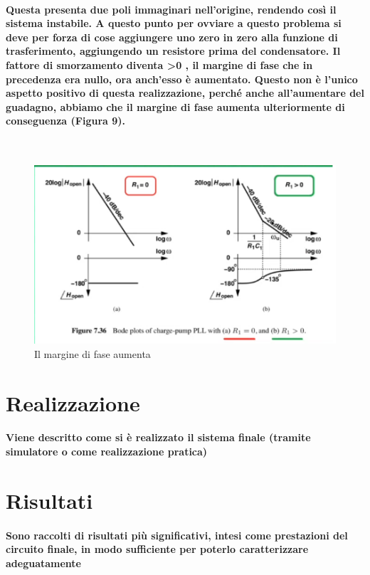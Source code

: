 \documentclass{article}
\begin{document}
\paragraph{Questa presenta due poli immaginari nell'origine, rendendo così il sistema instabile. A questo punto per ovviare a questo problema si deve per forza di cose aggiungere uno zero in zero alla funzione di trasferimento, aggiungendo un resistore prima del condensatore.
Il fattore di smorzamento diventa >0 , il margine di fase che in precedenza era nullo, ora anch'esso è aumentato.  
Questo non è l'unico aspetto positivo di questa realizzazione, perché anche all'aumentare del guadagno, abbiamo che il margine di fase aumenta ulteriormente di conseguenza (Figura 9).}
~\begin{figure}[!h]%
\includegraphics[scale=0.8]{ZPFD.png} 
\caption{Il margine di fase aumenta}
\label{fig:foo}
\end{figure}

\newpage
\section{Realizzazione}
\paragraph{Viene descritto come si è realizzato il sistema finale (tramite simulatore o come realizzazione pratica)}

\newpage
\section{Risultati}
\paragraph{Sono  raccolti  di  risultati  più  significativi,  intesi  come  prestazioni  del  circuito  finale,  in  modo  sufficiente per poterlo caratterizzare adeguatamente}
\end{document}
